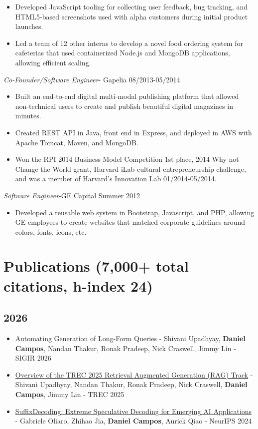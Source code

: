 \documentclass[line,margin]{res}
\begin{document}
\begin{resume}
\begin{itemize}
\item Developed JavaScript tooling for collecting user feedback, bug tracking, and HTML5-based screenshots used with alpha customers during initial product launches. 
\item Led a team of 12 other interns to develop a novel food ordering system for cafeterias that used containerized Node.js and MongoDB applications, allowing efficient scaling.
\end{itemize}
{\sl Co-Founder/Software Engineer}- Gapelia \hfill 08/2013-05/2014
\begin{itemize}  \itemsep -4pt
\item Built an end-to-end digital multi-modal publishing platform that allowed non-technical users to create and publish beautiful digital magazines in minutes.
\item Created REST API in Java, front end in Express, and deployed in AWS with Apache Tomcat, Maven, and MongoDB.
\item Won the RPI 2014 Business Model Competition 1st place, 2014 Why not Change the World grant, Harvard iLab cultural entrepreneurship challenge, and was a member of Harvard's Innovation Lab 01/2014-05/2014.
\end{itemize}
{\sl Software Engineer}-GE Capital \hfill Summer 2012
\begin{itemize}  \itemsep -4pt
\item Developed a reusable web system in Bootstrap, Javascript, and PHP, allowing GE employees to create websites that matched corporate guidelines around colors, fonts, icons, etc.
\end{itemize}
\section{Publications (7,000+ total citations, h-index 24)}
\subsection{2026}
\begin{itemize}
    \item Automating Generation of Long-Form Queries - Shivani Upadhyay, \textbf{Daniel Campos}, Nandan Thakur, Ronak Pradeep, Nick Craswell, Jimmy Lin - SIGIR 2026
    \item \href{https://arxiv.org/abs/2603.09891}{Overview of the TREC 2025 Retrieval Augmented Generation (RAG) Track} - Shivani Upadhyay, Nandan Thakur, Ronak Pradeep, Nick Craswell, \textbf{Daniel Campos}, Jimmy Lin - TREC 2025
    \item \href{https://arxiv.org/abs/2411.04975}{SuffixDecoding: Extreme Speculative Decoding for Emerging AI Applications} - Gabriele Oliaro, Zhihao Jia, \textbf{Daniel Campos}, Aurick Qiao - NeurIPS 2024
\end{itemize}

\end{resume}
\end{document}
